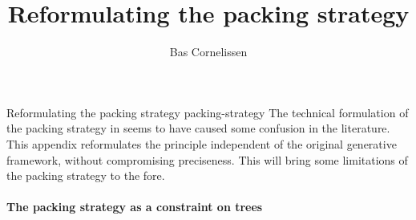 \documentclass{../src/bcthesispart}
\title{Reformulating the packing strategy}
\author{Bas Cornelissen}
\begin{document}

%
	{Reformulating the packing strategy}%
	{packing-strategy}{%
	The technical formulation of the packing strategy in \parencite{Hurford1975} seems to have caused some confusion in the literature.
	This appendix reformulates the principle independent of the original generative framework, without compromising preciseness.
	This will bring some limitations of the packing strategy to the fore.
}



\paragraph{The packing strategy as a constraint on trees}
\end{document}

